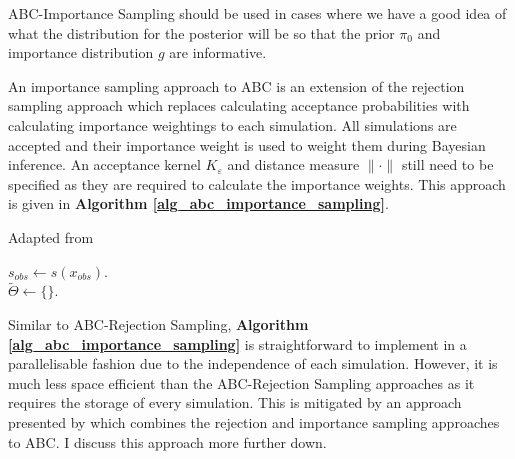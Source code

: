 \documentclass[11pt,a4paper]{article}
\theoremstyle{break}
\begin{document}
  \par ABC-Importance Sampling should be used in cases where we have a good idea of what the distribution for the posterior will be so that the prior $\pi_0$ and importance distribution $g$ are informative.

  \par An importance sampling approach to ABC is an extension of the rejection sampling approach which replaces calculating acceptance probabilities with calculating importance weightings to each simulation. All simulations are accepted and their importance weight is used to weight them during Bayesian inference. An acceptance kernel $K_\varepsilon$ and distance measure $\|\cdot\|$ still need to be specified as they are required to calculate the importance weights. This approach is given in \textbf{Algorithm \ref{alg_abc_importance_sampling}}.

  \begin{box_algorithm}\label{alg_abc_importance_sampling}
    Adapted from \cite[]{abc_samplers}
    \begin{algorithm}[H]
      $s_{obs}\leftarrow s(x_{obs})$.\\
      $\tilde\Theta\leftarrow\{\}$.\\
    \end{algorithm}
  \end{box_algorithm}

  \par Similar to ABC-Rejection Sampling, \textbf{Algorithm \ref{alg_abc_importance_sampling}} is straightforward to implement in a parallelisable fashion due to the independence of each simulation. However, it is much less space efficient than the ABC-Rejection Sampling approaches as it requires the storage of every simulation. This is mitigated by an approach presented by \cite[]{constructing_summary_statistics_for_approximate_bayesian_computation_semi_automatic_ABC} which combines the rejection and importance sampling approaches to ABC. I discuss this approach more further down.
\end{document}
